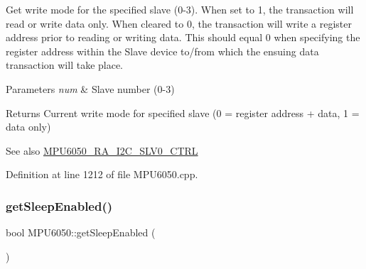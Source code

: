 Get write mode for the specified slave (0-\/3). When set to 1, the transaction will read or write data only. When cleared to 0, the transaction will write a register address prior to reading or writing data. This should equal 0 when specifying the register address within the Slave device to/from which the ensuing data transaction will take place.


\begin{DoxyParams}{Parameters}
{\em num} & Slave number (0-\/3) \\
\hline
\end{DoxyParams}
\begin{DoxyReturn}{Returns}
Current write mode for specified slave (0 = register address + data, 1 = data only) 
\end{DoxyReturn}
\begin{DoxySeeAlso}{See also}
\mbox{\hyperlink{MPU6050_8h_a70ce4d71982a1e3fb2be9b71f40da786}{M\+P\+U6050\+\_\+\+R\+A\+\_\+\+I2\+C\+\_\+\+S\+L\+V0\+\_\+\+C\+T\+RL}} 
\end{DoxySeeAlso}


Definition at line 1212 of file M\+P\+U6050.\+cpp.


\begin{DoxyCode}{0}

\end{DoxyCode}
\mbox{\label{classMPU6050_a196404ef04b959083d4bf5e6f1cd8b98}} 
\subsubsection{\texorpdfstring{getSleepEnabled()}{getSleepEnabled()}}
{\footnotesize\ttfamily bool M\+P\+U6050\+::get\+Sleep\+Enabled (\begin{DoxyParamCaption}{ }\end{DoxyParamCaption})}

